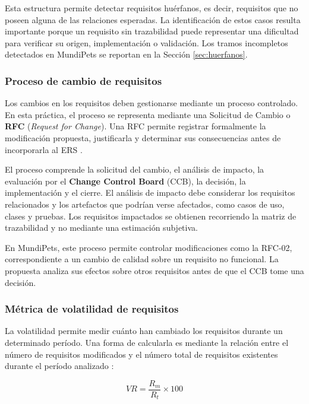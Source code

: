\documentclass[journal,onecolumn]{IEEEtran}
\begin{document}
	Esta estructura permite detectar requisitos huérfanos, es decir, requisitos que no poseen alguna de
	las relaciones esperadas. La identificación de estos casos resulta importante porque un requisito
	sin trazabilidad puede representar una dificultad para verificar su origen, implementación o
	validación. Los tramos incompletos detectados en MundiPets se reportan en la Sección
	\ref{sec:huerfanos}.
	
	\subsubsection{Proceso de cambio de requisitos}
	
	Los cambios en los requisitos deben gestionarse mediante un proceso controlado. En esta práctica,
	el proceso se representa mediante una Solicitud de Cambio o \textbf{RFC} (\emph{Request for
		Change}). Una RFC permite registrar formalmente la modificación propuesta, justificarla y
	determinar sus consecuencias antes de incorporarla al ERS \cite{pmbok7}.
	
	El proceso comprende la solicitud del cambio, el análisis de impacto, la evaluación por el
	\textbf{Change Control Board} (CCB), la decisión, la implementación y el cierre. El análisis de
	impacto debe considerar los requisitos relacionados y los artefactos que podrían verse afectados,
	como casos de uso, clases y pruebas. Los requisitos impactados se obtienen recorriendo la matriz
	de trazabilidad y no mediante una estimación subjetiva.
	
	En MundiPets, este proceso permite controlar modificaciones como la RFC-02, correspondiente a un
	cambio de calidad sobre un requisito no funcional. La propuesta analiza sus efectos sobre otros
	requisitos antes de que el CCB tome una decisión.
	
	\subsubsection{Métrica de volatilidad de requisitos}
	
	La volatilidad permite medir cuánto han cambiado los requisitos durante un determinado período.
	Una forma de calcularla es mediante la relación entre el número de requisitos modificados y el
	número total de requisitos existentes durante el período analizado \cite{wiegers2013}:
	
	\begin{equation}
		VR = \frac{R_m}{R_t} \times 100
		\label{eq:volatilidad}
	\end{equation}
	
\end{document}
